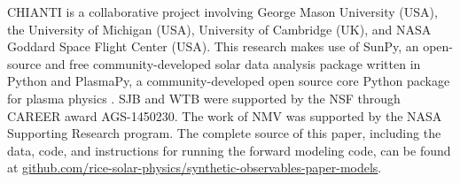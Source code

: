 \documentclass[preprint2]{aastex62}
\begin{document}






\acknowledgments
CHIANTI is a collaborative project involving George Mason University (USA), the University of Michigan (USA), University of Cambridge (UK), and NASA Goddard Space Flight Center (USA). This research makes use of SunPy, an open-source and free community-developed solar data analysis package written in Python \citep{sunpy_community_sunpypython_2015} and PlasmaPy, a community-developed open source core Python package for plasma physics \citep{plasmapy_community_2018_1238132}. SJB and WTB were supported by the NSF through CAREER award AGS-1450230. The work of NMV was supported by the NASA Supporting Research program. The complete source of this paper, including the data, code, and instructions for running the forward modeling code, can be found at \href{https://github.com/rice-solar-physics/synthetic-observables-paper-models}{github.com/rice-solar-physics/synthetic-observables-paper-models}.


\end{document}

